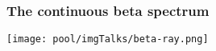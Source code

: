 \begin{frame}
\frametitle{The continuous beta spectrum}

\texttt{[image: pool/imgTalks/beta-ray.png]}
 
\end{frame}